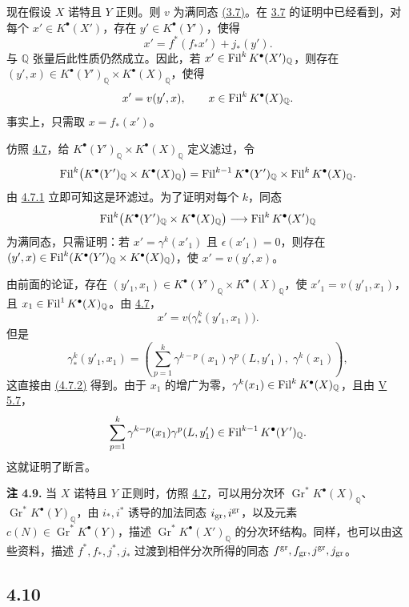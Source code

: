 现在假设 \(X\) 诺特且 \(Y\) 正则。则 \(v\) 为满同态 \hyperlink{sga6.e07.thm.3-7}{(3.7)}。在 \hyperlink{sga6.e07.thm.3-7}{3.7} 的证明中已经看到，对每个 \(x'\in K^\bullet(X')\)，存在 \(y'\in K^\bullet(Y')\)，使得
\[
  x'=f^*(f_*x')+j_*(y').
\]
与 \(\mathbb Q\) 张量后此性质仍然成立。因此，若 \(x'\in\operatorname{Fil}^kK^\bullet(X')_{\mathbb Q}\)，则存在 \((y',x)\in K^\bullet(Y')_{\mathbb Q}\times K^\bullet(X)_{\mathbb Q}\)，使得
\[
  x'=v(y',x),\qquad x\in\operatorname{Fil}^kK^\bullet(X)_{\mathbb Q}.
\]
事实上，只需取 \(x=f_*(x')\)。

仿照 \hyperlink{sga6.e07.sec.4.7}{4.7}，给 \(K^\bullet(Y')_{\mathbb Q}\times K^\bullet(X)_{\mathbb Q}\) 定义滤过，令
\[
  \operatorname{Fil}^k\bigl(K^\bullet(Y')_{\mathbb Q}\times K^\bullet(X)_{\mathbb Q}\bigr)
  =
  \operatorname{Fil}^{k-1}K^\bullet(Y')_{\mathbb Q}\times \operatorname{Fil}^kK^\bullet(X)_{\mathbb Q}.
\]
由 \hyperlink{sga6.e07.eq.4-7-1}{4.7.1} 立即可知这是环滤过。为了证明对每个 \(k\)，同态
\[
  \operatorname{Fil}^k\bigl(K^\bullet(Y')_{\mathbb Q}\times K^\bullet(X)_{\mathbb Q}\bigr)
  \longrightarrow
  \operatorname{Fil}^kK^\bullet(X')_{\mathbb Q}
\]
为满同态，只需证明：若 \(x'=\gamma^k(x'_1)\) 且 \(\epsilon(x'_1)=0\)，则存在 \((y',x)\in\operatorname{Fil}^k(K^\bullet(Y')_{\mathbb Q}\times K^\bullet(X)_{\mathbb Q})\)，使 \(x'=v(y',x)\)。

由前面的论证，存在 \((y'_1,x_1)\in K^\bullet(Y')_{\mathbb Q}\times K^\bullet(X)_{\mathbb Q}\)，使 \(x'_1=v(y'_1,x_1)\)，且 \(x_1\in\operatorname{Fil}^1K^\bullet(X)_{\mathbb Q}\)。由 \hyperlink{sga6.e07.sec.4.7}{4.7}，
\[
  x'=v\bigl(\gamma^k_*(y'_1,x_1)\bigr).
\]
但是
\[
  \gamma^k_*(y'_1,x_1)
  =
  \left(\sum_{p=1}^{k}\gamma^{k-p}(x_1)\gamma^p(L,y'_1),\;\gamma^k(x_1)\right),
\]
这直接由 \hyperlink{sga6.e07.eq.4-7-2}{(4.7.2)} 得到。由于 \(x_1\) 的增广为零，\(\gamma^k(x_1)\in\operatorname{Fil}^kK^\bullet(X)_{\mathbb Q}\)，且由 \hyperlink{sga6.e05.prop.5-7}{V 5.7}，
\[
  \sum_{p=1}^{k}\gamma^{k-p}(x_1)\gamma^p(L,y'_1)
  \in\operatorname{Fil}^{k-1}K^\bullet(Y')_{\mathbb Q}.
\]
这就证明了断言。

\textbf{注 4.9.} 当 \(X\) 诺特且 \(Y\) 正则时，仿照 \hyperlink{sga6.e07.sec.4.7}{4.7}，可以用分次环 \(\operatorname{Gr}^*K^\bullet(X)_{\mathbb Q}\)、\(\operatorname{Gr}^*K^\bullet(Y)_{\mathbb Q}\)，由 \(i_*,i^*\) 诱导的加法同态 \(i_{\operatorname{gr}},i^{\operatorname{gr}}\)，以及元素 \(c(N)\in\operatorname{Gr}^*K^\bullet(Y)\)，描述 \(\operatorname{Gr}^*K^\bullet(X')_{\mathbb Q}\) 的分次环结构。同样，也可以由这些资料，描述 \(f^*,f_*,j^*,j_*\) 过渡到相伴分次所得的同态 \(f^{\operatorname{gr}},f_{\operatorname{gr}},j^{\operatorname{gr}},j_{\operatorname{gr}}\)。

\subsection*{4.10}

